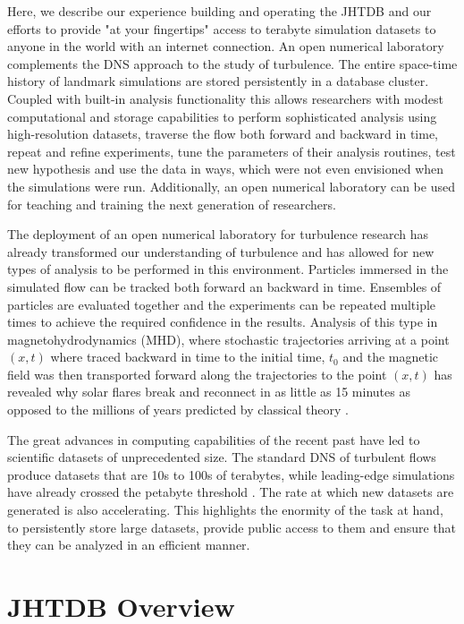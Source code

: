 \documentclass[10pt,twocolumn]{article}
\begin{document}
Here, we describe our experience building and operating the JHTDB and our efforts to provide "at your fingertips" access to terabyte simulation datasets
to anyone in the world with an internet connection. An open numerical laboratory complements the DNS approach to the study of turbulence. The entire
space-time history of landmark simulations are stored persistently in a database cluster. Coupled with built-in analysis functionality this allows researchers
with modest computational and storage capabilities to perform sophisticated analysis using high-resolution datasets, traverse the flow both forward and
backward in time, repeat and refine experiments, tune the parameters of their analysis routines, test new hypothesis and use the data in ways, which were 
not even envisioned when the simulations were run. Additionally, an open numerical laboratory can be used for teaching and training the next generation 
of researchers.

The deployment of an open numerical laboratory for turbulence research has already transformed our understanding of turbulence and has allowed for new
types of analysis to be performed in this environment. Particles immersed in the simulated flow can be tracked both forward an backward in time. 
Ensembles of particles are evaluated together and the experiments can be repeated multiple times to achieve the required confidence in the results.
Analysis of this type in magnetohydrodynamics (MHD), where stochastic trajectories arriving at a point $(x, t)$ where traced backward in time to the initial 
time, $t_0$ and the magnetic field was then transported forward along the trajectories to the point $(x, t)$ has revealed why  solar flares break and reconnect 
in as little as 15 minutes as opposed to the millions of years predicted by classical theory \cite{Eyink}.

The great advances in computing capabilities of the recent past have led to scientific datasets of unprecedented size. The standard DNS of turbulent flows
produce datasets that are 10s to 100s of terabytes, while leading-edge simulations have already crossed the petabyte threshold \cite{Lee}. The rate at
which new datasets are generated is also accelerating. This highlights the enormity of the task at hand, to persistently store large datasets, provide public access
to them and ensure that they can be analyzed in an efficient manner. 

\section{JHTDB Overview}
\end{document}
